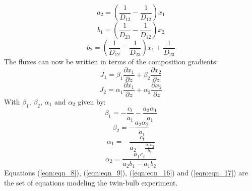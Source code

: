 \documentclass[twocolumn]{article}
\begin{document}
\begin{equation}
\label{eqn:eqn_13}
a_2 = \left( \frac{1}{D_{13}} - \frac{1}{D_{12}} \right) x_1
\end{equation}
\begin{equation}
\label{eqn:eqn_14}
b_1 = \left( \frac{1}{D_{23}} - \frac{1}{D_{12}} \right) x_2
\end{equation}
\begin{equation}
\label{eqn:eqn_15}
b_2 = \left( \frac{1}{D_{12}} - \frac{1}{D_{23}} \right) x_1 + \frac{1}{D_{23}}
\end{equation}
The fluxes can now be written in terms of the composition gradients:
\begin{equation}
\label{eqn:eqn_16}
J_1 = \beta_1 \frac{\partial x_1}{\partial z} + \beta_2 \frac{\partial x_2}{\partial z}
\end{equation}
\begin{equation}
\label{eqn:eqn_17}
J_2 = \alpha_1 \frac{\partial x_1}{\partial z} + \alpha_2 \frac{\partial x_2}{\partial z}
\end{equation}
With $\beta_1$, $\beta_2$, $\alpha_1$ and $\alpha_2$ given by:
\begin{equation}
\label{eqn:eqn_18}
\beta_1 = -\frac{c_t}{a_1} - \frac{a_2 \alpha_1}{a_1}
\end{equation}
\begin{equation}
\label{eqn:eqn_19}
\beta_2 = - \frac{a_2 \alpha_2}{a_1}
\end{equation}
\begin{equation}
\label{eqn:eqn_20}
\alpha_1 = - \frac{c_t}{a_2 - \frac{a_1 b_2}{b_1}}
\end{equation}
\begin{equation}
\label{eqn:eqn_21}
\alpha_2 = \frac{a_1 c_t}{a_2 b_1 - a_1 b_2}
\end{equation}
Equations (\ref{eqn:eqn_8}), (\ref{eqn:eqn_9}), (\ref{eqn:eqn_16}) and (\ref{eqn:eqn_17}) are the set of equations modeling the twin-bulb experiment.
\end{document}
